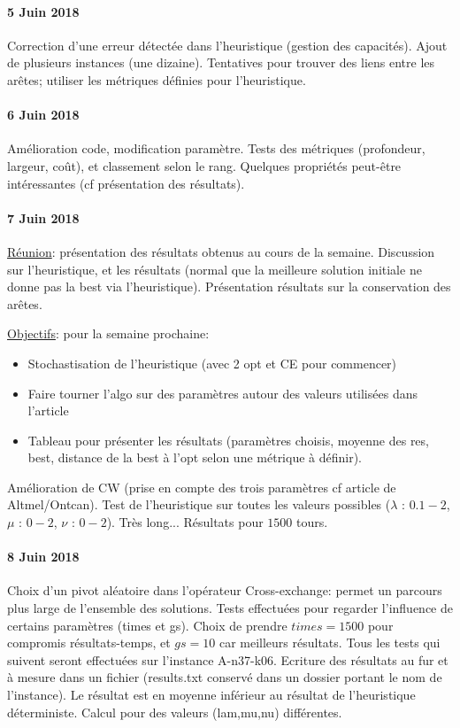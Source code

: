 \documentclass[a4paper,11pt]{article}%
\begin{document}
\paragraph*{5 Juin 2018}
Correction d'une erreur détectée dans l'heuristique (gestion des capacités). Ajout de plusieurs instances (une dizaine). Tentatives pour trouver des liens entre les arêtes; utiliser les métriques définies pour l'heuristique.

\paragraph*{6 Juin 2018}
Amélioration code, modification paramètre. Tests des métriques (profondeur, largeur, coût), et classement selon le rang. Quelques propriétés peut-être intéressantes (cf présentation des résultats).

\paragraph*{7 Juin 2018}

\underline{Réunion}: présentation des résultats obtenus au cours de la semaine. Discussion sur l'heuristique, et les résultats (normal que la meilleure solution initiale ne donne pas la best via l'heuristique). Présentation résultats sur la conservation des arêtes. 

\underline{Objectifs}: pour la semaine prochaine:
\begin{itemize}
\item Stochastisation de l'heuristique (avec 2 opt et CE pour commencer)
\item Faire tourner l'algo sur des paramètres autour des valeurs utilisées dans l'article
\item Tableau pour présenter les résultats (paramètres choisis, moyenne des res, best, distance de la best à l'opt selon une métrique à définir).
\end{itemize}

Amélioration de CW (prise en compte des trois paramètres cf article de Altmel/Ontcan). Test de l'heuristique sur toutes les valeurs possibles ($\lambda$ : $0.1 - 2$, $\mu$ : $0 - 2$, $\nu$ : $0 - 2$). Très long... Résultats pour $1500$ tours. 

\paragraph*{8 Juin 2018}

Choix d'un pivot aléatoire dans l'opérateur Cross-exchange: permet un parcours plus large de l'ensemble des solutions. Tests effectuées pour regarder l'influence de certains paramètres (times et gs). Choix de prendre $times = 1500$ pour compromis résultats-temps, et $gs = 10$ car meilleurs résultats. Tous les tests qui suivent seront effectuées sur l'instance A-n37-k06. Ecriture des résultats au fur et à mesure dans un fichier (results.txt conservé dans un dossier portant le nom de l'instance). Le résultat est en moyenne inférieur au résultat de l'heuristique déterministe. Calcul pour des valeurs (lam,mu,nu) différentes. 
\end{document}
